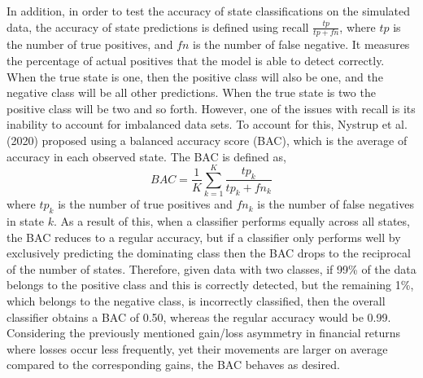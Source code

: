 In addition, in order to test the accuracy of state classifications on the simulated data, the accuracy of state predictions is defined using recall $\frac{tp}{tp+fn}$, where $tp$ is the number of true positives, and $fn$ is the number of false negative. It measures the percentage of actual positives that the model is able to detect correctly. When the true state is one, then the positive class will also be one, and the negative class will be all other predictions. When the true state is two the positive class will be two and so forth. However, one of the issues with recall is its inability to account for imbalanced data sets. To account for this, Nystrup et al. (2020) proposed using a balanced accuracy score (BAC), which is the average of accuracy in each observed state. The BAC is defined as,
\begin{equation}
    BAC = \frac{1}{K} \sum_{k=1}^K \frac{tp_k}{tp_k + fn_k}
    \label{eq: BAC definition}
\end{equation}
where $tp_k$ is the number of true positives and $fn_k$ is the number of false negatives in state $k$. As a result of this, when a classifier performs equally across all states, the BAC reduces to a regular accuracy, but if a classifier only performs well by exclusively predicting the dominating class then the BAC drops to the reciprocal of the number of states. Therefore, given data with two classes, if 99\% of the data belongs to the positive class and this is correctly detected, but the remaining 1\%, which belongs to the negative class, is incorrectly classified, then the overall classifier obtains a BAC of 0.50, whereas the regular accuracy would be 0.99. Considering the previously mentioned gain/loss asymmetry in financial returns where losses occur less frequently, yet their movements are larger on average compared to the corresponding gains, the BAC behaves as desired.

